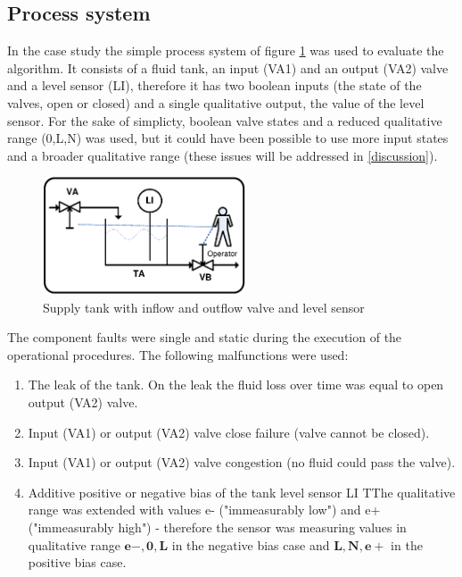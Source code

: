 \documentclass[conference]{IEEEtran}
\begin{document}
\subsection{Process system}
\label{ref:procsys}

In the case study the simple process system of figure \ref{fig:tank} was used to evaluate the algorithm. It consists of a fluid tank, an input (VA1) and an output (VA2) valve and a level sensor (LI), therefore it has two boolean inputs (the state of the valves, open or closed) and a single qualitative output, the value of the level sensor. For the sake of simplicty, boolean valve states and a reduced qualitative range ({0,L,N}) was used, but it could have been possible to use more input states and a broader qualitative range (these issues will be addressed in \ref{discussion}). 

\begin{figure}[h!]
 \begin{center}
  \includegraphics[width=6cm]{Stank.eps}
  \caption {Supply tank with inflow and outflow valve and level sensor}
  \label{fig:tank}
 \end{center}
\end{figure} 

The component faults were single and static during the execution of the operational procedures. The following malfunctions were used:
\begin{enumerate}
\item The leak of the tank. On the leak the fluid loss over time was equal to open output (VA2) valve.
\item Input (VA1) or output (VA2) valve close failure (valve cannot be closed).
\item Input (VA1) or output (VA2) valve congestion (no fluid could pass the valve).
\item Additive positive or negative bias of the tank level sensor LI TThe qualitative range was extended with values e- ("immeasurably low") and e+("immeasurably high") - therefore the sensor was measuring values in qualitative range $\mathbf{e-,0,L}$ in the negative bias case and $\mathbf{L,N,e+}$ in the positive bias case.
\end{enumerate}
\end{document}
